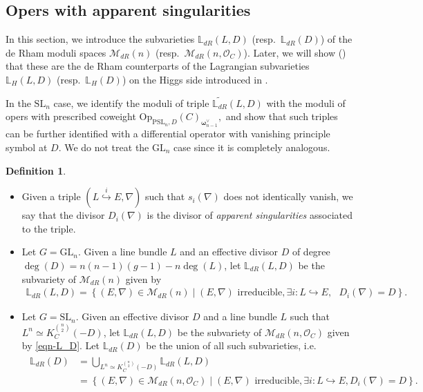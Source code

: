 \documentclass[twoside, 11pt]{article}
\numberwithin{equation}{section}
\theoremstyle{theorem}
\numberwithin{theorem}{section}
\theoremstyle{definition}
\newtheorem{definition}[definition]{Definition}
\begin{document}
\subsection{Opers with apparent singularities}

In this section, we introduce the subvarieties $\mathbb L_{dR}(L,D)$ (resp.\ $\mathbb L_{dR}(D)$) of the de Rham moduli spaces $\mathcal M_{dR}(n)$ (resp.\ $\mathcal{M}_{dR}(n, \mathcal{O}_C)$). Later, we will show () that these are the de Rham counterparts of the Lagrangian subvarieties  $\mathbb L_H(L,D)$ (resp.\ $\mathbb L_H(D)$) on the Higgs side introduced in . 


In the $\mathrm{SL}_n$ case, we identify the moduli of triple $\widetilde{\mathbb{L}_{dR}}(L,D)$ with the moduli of opers with prescribed coweight
\(
\mathrm{Op}_{\mathrm{PSL}_n,D}(C)_{\boldsymbol{\omega}_{n-1}^{\vee}},
\)
and show that such triples can be further identified with a differential operator with vanishing principle symbol at $D$. We do not treat the $\mathrm{GL}_n$ case since it is completely analogous.


\begin{definition}\label{def: Lag in dR}
\begin{itemize}
\item Given a triple $(L \overset{i}{\hookrightarrow} E, \nabla)$ such that $s_i(\nabla)$ does not identically vanish,
we say that the divisor $D_i(\nabla)$ is the divisor of \textit{apparent singularities} associated to the triple.
\item 
Let $G = \mathrm{GL}_n$.
Given a line bundle $L$ and an effective divisor $D$ of degree 
$\deg(D) = n(n-1)(g-1) - n \deg(L)$, 
let \(\mathbb{L}_{dR}(L, D)\) be the subvariety of \(\mathcal{M}_{dR}(n)\) given by 
\begin{align}\label{eqn-L_D}
    \mathbb{L}_{dR}(L, D) = 
\left\{ (E, \nabla) \in \mathcal{M}_{dR}(n) 
\mid (E, \nabla) \text{ irreducible}, \exists i: L \hookrightarrow E, \text{ } D_i(\nabla) = D\right\}.
\end{align}
\item Let $G = \mathrm{SL}_n$.
Given an effective divisor $D$ and a line bundle $L$ such that 
$L^n \simeq K_C^{n \choose 2}(-D)$,
let \(\mathbb{L}_{dR}(L, D)\) be the subvariety
of \(\mathcal{M}_{dR}(n, \mathcal{O}_C)\) given by \eqref{eqn-L_D}.
Let $\mathbb{L}_{dR}(D)$ be the union of all such subvarieties, i.e.
\begin{align}
\begin{split}
    \mathbb{L}_{dR}(D) &= \bigcup_{L^n \simeq K_C^{n \choose 2}(-D)} \mathbb{L}_{dR}(L, D) \\
    &= 
\left\{ (E, \nabla) \in \mathcal{M}_{dR}(n, \mathcal{O}_C) 
\mid (E, \nabla) \text{ irreducible}, \exists i: L \hookrightarrow E, D_i(\nabla) = D\right\}.
\end{split}
\end{align}

\end{itemize}
\end{definition}
\end{document}
